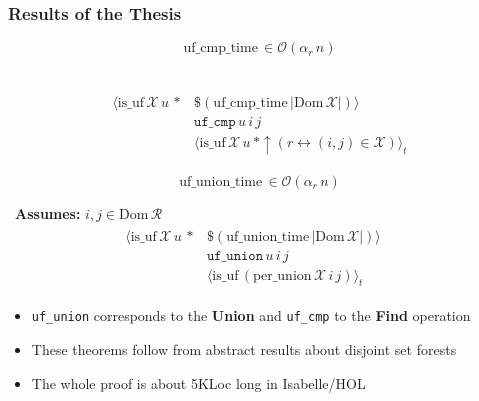 \begin{frame}
	\frametitle{Results of the Thesis}
	\vspace{0.6cm}
	\begin{minipage}{0.48\linewidth}
\begin{lma}
	\begin{equation*}
	\mathrm{uf\_cmp\_time}\, \in \mathcal{O}(\alpha_r\,n)
	\end{equation*}
\end{lma}

\begin{thm}
	\,\newline
	\begin{align*}
	\begin{split}
	\langle \mathrm{is\_uf}\, \mathcal{X}\, u\, * &\$(\mathrm{uf\_cmp\_time}\, |\mathrm{Dom}\, \mathcal{X}|)\rangle \quad \\ 
	&\mathtt{uf\_cmp}\, u\, i\, j\\
	&\langle \mathrm{is\_uf}\, \mathcal{X}\, u\, * \uparrow(r \leftrightarrow (i,j)\in\mathcal{X}) \rangle_t
	\end{split}
	\end{align*}
\end{thm}
	\end{minipage}
	\begin{minipage}{0.40\linewidth}
\begin{lma}
	\begin{equation*}
	\mathrm{uf\_union\_time}\, \in \mathcal{O}(\alpha_r\,n)
	\end{equation*}
\end{lma}
\begin{thm}\,\newline
	\textbf{Assumes: } $i,j \in \mathrm{Dom}\, \mathcal{R}$
	\begin{align*}
	\begin{split}
	\langle \mathrm{is\_uf}\, \mathcal{X}\, u\, * &\$(\mathrm{uf\_union\_time}\, |\mathrm{Dom}\, \mathcal{X}|)\rangle \quad \\
	&\mathtt{uf\_union}\, u\, i\, j\\
	&\langle \mathrm{is\_uf}\, (\mathrm{per\_union}\, \mathcal{X}\, i\, j)\rangle_t
	\end{split}
	\end{align*}
\end{thm}
\end{minipage}
\vspace{-0.4cm}
\begin{itemize}
	\item \texttt{uf\_union} corresponds to the \textbf{Union} and \texttt{uf\_cmp} to the \textbf{Find} operation
	\item These theorems follow from abstract results about disjoint set forests
	\item The whole proof is about 5KLoc long in Isabelle/HOL
\end{itemize}
\end{frame}

